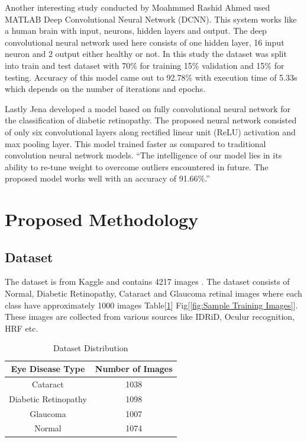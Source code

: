 \documentclass[conference]{IEEEtran}
\begin{document}
\vspace{5pt}
Another interesting study conducted by Moahmmed Rashid Ahmed used MATLAB Deep Convolutional Neural Network (DCNN). This system works like a human brain with input, neurons, hidden layers and output. The deep convolutional neural network used here consists of one hidden layer, 16 input neuron and 2 output either healthy or not. In this study the dataset was split into train and test dataset with 70\% for training 15\% validation and 15\% for testing. Accuracy of this model came out to 92.78\% with execution time of 5.33s which depends on the number of iterations and epochs. \cite{b13}

\vspace{5pt}
Lastly Jena developed a model based on fully convolutional neural network for the classification of diabetic retinopathy. The proposed neural network consisted of only six convolutional layers along rectified linear unit (ReLU) activation and max pooling layer. This model trained faster as compared to traditional convolution neural network models. “The intelligence of our model lies in its ability to re-tune weight to overcome outliers encountered in future. The proposed model works well with an accuracy of 91.66\%.” \cite{b14}


\section{Proposed Methodology}

\subsection{Dataset}\label{AA}
The dataset is from Kaggle and contains 4217 images \cite{b15}. The dataset consists of Normal, Diabetic Retinopathy, Cataract and Glaucoma retinal images where each class have approximately 1000 images Table[\ref{tab:Dataset Distribution}] Fig[\ref{fig:Sample Training Images}]. These images are collected from various sources like IDRiD, Oculur recognition, HRF etc.

\begin{table}[h]
\centering
\begin{adjustbox}{width= 5cm, height=1.3cm}
\begin{tabular}{|c|c|}
\hline
\textbf{Eye Disease Type} & \textbf{Number of Images} \\ \hline
Cataract & 1038 \\ \hline
Diabetic Retinopathy & 1098 \\ \hline
Glaucoma & 1007 \\ \hline
Normal & 1074 \\ \hline
\end{tabular}
\end{adjustbox}
\vspace{5pt}
\caption{Dataset Distribution}
\label{tab:Dataset Distribution}
\end{table}
\end{document}
